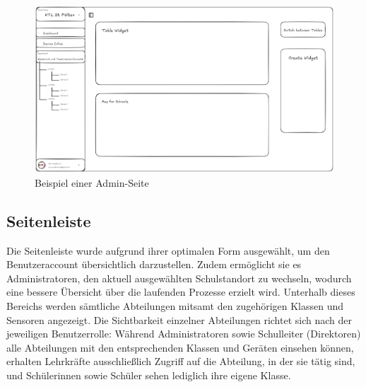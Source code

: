 \begin{inhalt}
\vspace{1cm}


\begin{figure}[!htb] 
\centering 
\includegraphics[width=1\textwidth]{files/Thomas/pics/Design-Grundlagen/Frontend/AdminSeite/AdminSeite-Draw.png} 
\caption[Beispiel einer Admin-Seite]{Beispiel einer Admin-Seite} 
\label{fig:gehaeuse_internet_bild} 
\end{figure}

\newpage

\subsection{Seitenleiste}

Die Seitenleiste \cite{ShadCNSidebar} wurde aufgrund ihrer optimalen Form ausgewählt, um den Benutzeraccount übersichtlich darzustellen. Zudem ermöglicht sie es Administratoren, den aktuell ausgewählten Schulstandort zu wechseln, wodurch eine bessere Übersicht über die laufenden Prozesse erzielt wird. Unterhalb dieses Bereichs werden sämtliche Abteilungen mitsamt den zugehörigen Klassen und Sensoren angezeigt. Die Sichtbarkeit einzelner Abteilungen richtet sich nach der jeweiligen Benutzerrolle: Während Administratoren sowie Schulleiter (Direktoren) alle Abteilungen mit den entsprechenden Klassen und Geräten einsehen können, erhalten Lehrkräfte ausschließlich Zugriff auf die Abteilung, in der sie tätig sind, und Schülerinnen sowie Schüler sehen lediglich ihre eigene Klasse.




\end{inhalt}
